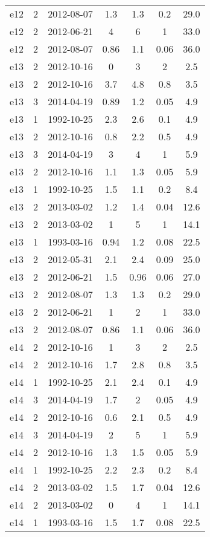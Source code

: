 \begin{table*}[htp]
\begin{tabular}{ccccccc}
e12 & 2 & 2012-08-07 & 1.3 & 1.3 & 0.2 & 29.0 \\
e12 & 2 & 2012-06-21 & 4 & 6 & 1 & 33.0 \\
e12 & 2 & 2012-08-07 & 0.86 & 1.1 & 0.06 & 36.0 \\
e13 & 2 & 2012-10-16 & 0 & 3 & 2 & 2.5 \\
e13 & 2 & 2012-10-16 & 3.7 & 4.8 & 0.8 & 3.5 \\
e13 & 3 & 2014-04-19 & 0.89 & 1.2 & 0.05 & 4.9 \\
e13 & 1 & 1992-10-25 & 2.3 & 2.6 & 0.1 & 4.9 \\
e13 & 2 & 2012-10-16 & 0.8 & 2.2 & 0.5 & 4.9 \\
e13 & 3 & 2014-04-19 & 3 & 4 & 1 & 5.9 \\
e13 & 2 & 2012-10-16 & 1.1 & 1.3 & 0.05 & 5.9 \\
e13 & 1 & 1992-10-25 & 1.5 & 1.1 & 0.2 & 8.4 \\
e13 & 2 & 2013-03-02 & 1.2 & 1.4 & 0.04 & 12.6 \\
e13 & 2 & 2013-03-02 & 1 & 5 & 1 & 14.1 \\
e13 & 1 & 1993-03-16 & 0.94 & 1.2 & 0.08 & 22.5 \\
e13 & 2 & 2012-05-31 & 2.1 & 2.4 & 0.09 & 25.0 \\
e13 & 2 & 2012-06-21 & 1.5 & 0.96 & 0.06 & 27.0 \\
e13 & 2 & 2012-08-07 & 1.3 & 1.3 & 0.2 & 29.0 \\
e13 & 2 & 2012-06-21 & 1 & 2 & 1 & 33.0 \\
e13 & 2 & 2012-08-07 & 0.86 & 1.1 & 0.06 & 36.0 \\
e14 & 2 & 2012-10-16 & 1 & 3 & 2 & 2.5 \\
e14 & 2 & 2012-10-16 & 1.7 & 2.8 & 0.8 & 3.5 \\
e14 & 1 & 1992-10-25 & 2.1 & 2.4 & 0.1 & 4.9 \\
e14 & 3 & 2014-04-19 & 1.7 & 2 & 0.05 & 4.9 \\
e14 & 2 & 2012-10-16 & 0.6 & 2.1 & 0.5 & 4.9 \\
e14 & 3 & 2014-04-19 & 2 & 5 & 1 & 5.9 \\
e14 & 2 & 2012-10-16 & 1.3 & 1.5 & 0.05 & 5.9 \\
e14 & 1 & 1992-10-25 & 2.2 & 2.3 & 0.2 & 8.4 \\
e14 & 2 & 2013-03-02 & 1.5 & 1.7 & 0.04 & 12.6 \\
e14 & 2 & 2013-03-02 & 0 & 4 & 1 & 14.1 \\
e14 & 1 & 1993-03-16 & 1.5 & 1.7 & 0.08 & 22.5 \\

\end{tabular}
\end{table*}
